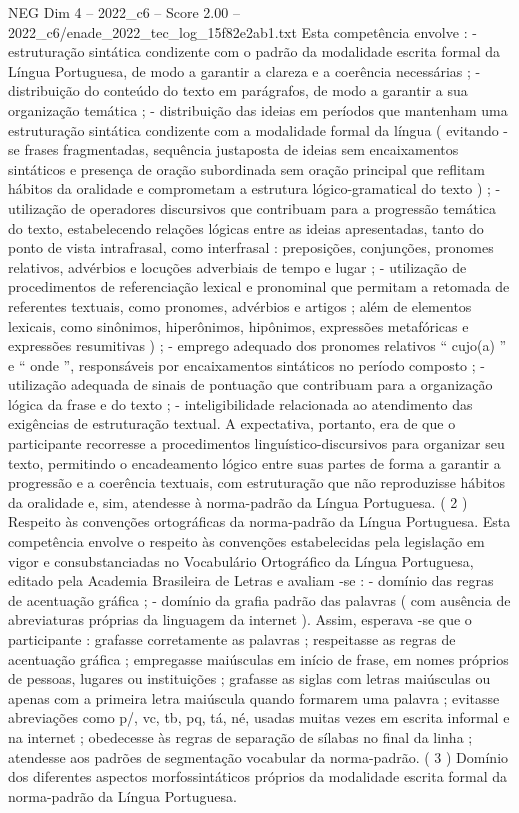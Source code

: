 \begin{textsample}{NEG Dim 4 – 2022\_c6 – Score 2.00 – 2022\_c6/enade\_2022\_tec\_log\_15f82e2ab1.txt}
Esta competência envolve : - estruturação sintática condizente com o padrão da modalidade escrita formal da Língua Portuguesa, de modo a garantir a clareza e a coerência necessárias ; - distribuição do conteúdo do texto em parágrafos, de modo a garantir a sua organização temática ; - distribuição das ideias em períodos que mantenham uma estruturação sintática condizente com a modalidade formal da língua ( evitando -se frases fragmentadas, sequência justaposta de ideias sem encaixamentos sintáticos e presença de oração subordinada sem oração principal que reflitam hábitos da oralidade e comprometam a estrutura lógico-gramatical do texto ) ; - utilização de operadores discursivos que contribuam para a progressão temática do texto, estabelecendo relações lógicas entre as ideias apresentadas, tanto do ponto de vista intrafrasal, como interfrasal : preposições, conjunções, pronomes relativos, advérbios e locuções adverbiais de tempo e lugar ; - utilização de procedimentos de referenciação lexical e pronominal que permitam a retomada de referentes textuais, como pronomes, advérbios e artigos ; além de elementos lexicais, como sinônimos, hiperônimos, hipônimos, expressões metafóricas e expressões resumitivas ) ; - emprego adequado dos pronomes relativos “ cujo(a) ” e “ onde ”, responsáveis por encaixamentos sintáticos no período composto ; - utilização adequada de sinais de pontuação que contribuam para a organização lógica da frase e do texto ; - inteligibilidade relacionada ao atendimento das exigências de estruturação textual.
A expectativa, portanto, era de que o participante recorresse a procedimentos linguístico-discursivos para organizar seu texto, permitindo o encadeamento lógico entre suas partes de forma a garantir a progressão e a coerência textuais, com estruturação que não reproduzisse hábitos da oralidade e, sim, atendesse à norma-padrão da Língua Portuguesa. ( 2 ) Respeito às convenções ortográficas da norma-padrão da Língua Portuguesa.
Esta competência envolve o respeito às convenções estabelecidas pela legislação em vigor e consubstanciadas no Vocabulário Ortográfico da Língua Portuguesa, editado pela Academia Brasileira de Letras e avaliam -se : - domínio das regras de acentuação gráfica ; - domínio da grafia padrão das palavras ( com ausência de abreviaturas próprias da linguagem da internet ).
Assim, esperava -se que o participante : grafasse corretamente as palavras ; respeitasse as regras de acentuação gráfica ; empregasse maiúsculas em início de frase, em nomes próprios de pessoas, lugares ou instituições ; grafasse as siglas com letras maiúsculas ou apenas com a primeira letra maiúscula quando formarem uma palavra ; evitasse abreviações como p/, vc, tb, pq, tá, né, usadas muitas vezes em escrita informal e na internet ; obedecesse às regras de separação de sílabas no final da linha ; atendesse aos padrões de segmentação vocabular da norma-padrão. ( 3 ) Domínio dos diferentes aspectos morfossintáticos próprios da modalidade escrita formal da norma-padrão da Língua Portuguesa.

\end{textsample}
